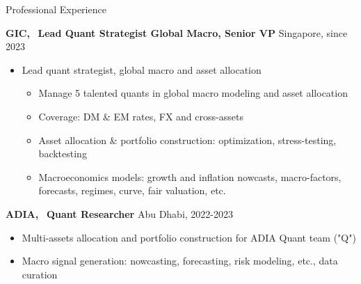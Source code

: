 \documentclass[usegeometry, 10pt, a4paper]{cv} %
\newcommand{\activite}[1]{\textbf{#1}\ }
\begin{document}
\vspace{0.5cm}


\begin{rubriquetableau}[0.95\textwidth]{Professional Experience}\\
\vspace{-0.5cm}

\activite{GIC,} \textbf{Lead Quant Strategist Global Macro, Senior VP} \hfill
Singapore, since 2023 \\ \vspace{-0.4cm}
\begin{itemize}[label={},rightmargin=\dimexpr\linewidth-13cm-\leftmargin\relax]

\item Lead quant strategist, global macro and asset allocation
\begin{itemize}
  \item Manage 5 talented quants in global macro modeling and asset allocation
  \item Coverage: DM \& EM rates, FX and cross-assets
  \item Asset allocation \& portfolio construction: optimization, stress-testing, backtesting
  \item Macroeconomics models: growth and inflation nowcasts, macro-factors, forecasts, regimes, curve, fair valuation, etc.
\end{itemize}

\end{itemize}
 
\vspace{0.2cm}

\activite{ADIA,} \textbf{Quant Researcher}  \hfill
Abu Dhabi, 2022-2023 \\ \vspace{-0.2cm}
\begin{itemize}[label={},
rightmargin=\dimexpr\linewidth-13cm-\leftmargin\relax]
\item Multi-assets  allocation and  portfolio  construction for ADIA Quant team ("Q")
\item Macro signal generation: nowcasting, forecasting, risk modeling, etc., data curation
 \end{itemize}
 
\vspace{0.2cm}


\end{rubriquetableau}
\end{document}
